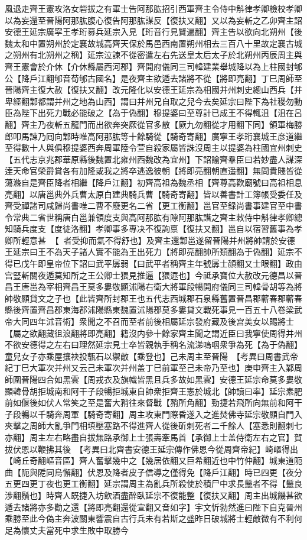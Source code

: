 風退走齊王憲攻洛女砦拔之有軍士告阿那肱招引西軍齊主令侍中斛律孝卿檢校孝卿以為妄還至晉陽阿那肱腹心復告阿那肱謀反【復扶又翻】又以為妄斬之乙卯齊主詔安德王延宗廣寜王孝珩募兵延宗入見【珩音行見賢遍翻】齊主告以欲向北朔州【後魏太和中置朔州於定襄故城高齊天保於馬邑西南置朔州相去三百八十里故定襄古城之朔州有北朔州之稱】延宗泣諫不從密遣左右先送皇太后太子於北朔州丙辰周主與齊王憲會於介休【介休縣屬西河郡】齊開府儀同三司韓建業舉城降以為上柱國封郇公【降戶江翻郇音荀郇古國名】是夜齊主欲遁去諸將不從【將即亮翻】丁巳周師至晉陽齊主復大赦【復扶又翻】改元隆化以安德王延宗為相國并州刺史總山西兵【并卑經翻鄴都謂并州之地為山西】謂曰并州兄自取之兒今去矣延宗曰陛下為社稷勿動臣為陛下出死力戰必能破之【為于偽翻】穆提婆曰至尊計已成王不得輒沮【沮在呂翻】齊主乃夜斬五龍門而出欲奔突厥從官多散【厥九勿翻從才用翻下同】領軍梅勝郎叩馬諫乃囘向鄴時唯高阿那肱等十餘騎從【騎奇寄翻】廣寧王孝珩襄城王彦道繼至得數十人與俱穆提婆西奔周軍陸令萱自殺家屬皆誅沒周主以提婆為柱國宜州刺史【五代志京兆郡華原縣後魏置北雍州西魏改為宜州】下詔諭齊羣臣曰若妙盡人謀深逹天命官榮爵賞各有加隆或我之將卒逃逸彼朝【將即亮翻朝直遥翻】無問貴賤皆從蕩滌自是齊臣降者相繼【降戶江翻】初齊高祖為魏丞相【齊尊高歡廟號曰高祖相息亮翻】以唐邕典外兵曹太原白建典騎兵曹【騎奇寄翻】皆以善書計工簿帳受委任及齊受禪諸司咸歸尚書唯二曹不廢更名二省【更工衡翻】邕官至録尚書事建官至中書令常典二省世稱唐白邕兼領度支與高阿那肱有隙阿那肱譖之齊主敕侍中斛律孝卿總知騎兵度支【度徒洛翻】孝卿事多專决不復詢禀【復扶又翻】邕自以宿習舊事為孝卿所輕意甚【者受抑而氣不得舒也】及齊主還鄴邕遂留晉陽并州將帥請於安德王延宗曰王不為天子諸人實不能為王出死力【將即亮翻帥所類翻為于偽翻】延宗不得已戊午即皇帝位下詔曰武平孱弱【曰武平者稱齊主年號孱士顔翻又士眼翻】政由宫豎斬關夜遁莫知所之王公卿士猥見推逼【猥遝也】今祗承寶位大赦改元德昌以晉昌王唐邕為宰相齊昌王莫多婁敬顯沭陽右衛大將軍段暢開府儀同三司韓骨胡等為將帥敬顯貸文之子也【此皆齊所封郡王也五代志西城郡石泉縣舊置晉昌郡蘄春郡蘄春縣後齊置齊昌郡東海郡沭陽縣東魏置沭陽郡莫多婁貸文戰死事見一百五十八卷梁武帝大同四年沭音術】衆聞之不召而至者前後相屬延宗發府藏及後宫美女以賜將士【屬之欲翻藏徂浪翻將即亮翻】籍沒内參十餘家齊主聞之謂近臣曰我寧使周得并州不欲安德得之左右曰理然延宗見士卒皆親執手稱名流涕嗚咽衆爭為死【為于偽翻】童兒女子亦乘屋攘袂投甎石以禦敵【乘登也】己未周主至晉陽　【考異曰周書武帝紀丁巳大軍次并州又云己未軍次并州盖丁巳前軍至己未帝乃至也】庚申齊主入鄴周師圍晉陽四合如黑雲【周戎衣及旗幟皆黑且兵多故如黑雲】安德王延宗命莫多婁敬顯韓骨胡拒城南和阿干子段暢拒城東自帥衆拒齊王憲於城北【帥讀曰率】延宗素肥前如偃後如伏人常笑之至是奮大矟往來督戰【矟所角翻】勁捷若飛所向無前和阿干子段暢以千騎奔周軍【騎奇寄翻】周主攻東門際昏遂入之進焚佛寺延宗敬顯自門入夾擊之周師大亂爭門相填壓塞路不得進齊人從後斫刺死者二千餘人【塞悉則翻刺七亦翻】周主左右略盡自拔無路承御上士張壽牽馬首【承御上士盖侍衛左右之官】賀拔伏恩以鞭拂其後　【考異曰北齊書安德王延宗傳作佛恩今從周齊帝紀】崎嶇得出【崎丘奇翻嶇音區】齊人奮擊幾中之【幾居依翻又巨希翻近也中竹仲翻】城東道阨曲【阨與阸同烏懈翻】伏恩及降者皮子信導之僅得免【降戶江翻】時已四更【夜分五更四更丁夜也更工衡翻】延宗謂周主為亂兵所殺使於積尸中求長鬛者不得【鬛良涉翻鬚也】時齊人既捷入坊飲酒盡醉臥延宗不復能整【復扶又翻】周主出城饑甚欲遁去諸將亦多勸之還【將即亮翻還從宣翻又音如字】宇文忻勃然進曰陛下自克晉州乘勝至此今偽主奔波關東響震自古行兵未有若斯之盛昨日破城將士輕敵微有不利何足為懷丈夫當死中求生敗中取勝今